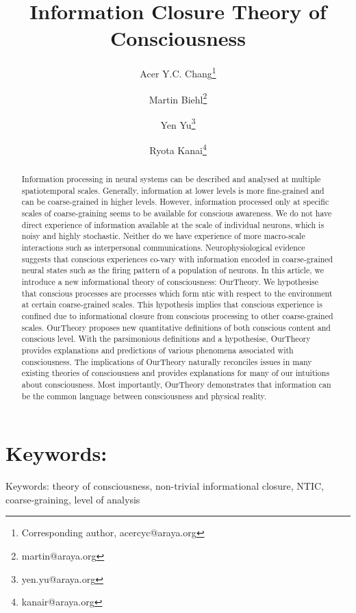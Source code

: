 \documentclass[utf8]{article}
\title{Information Closure Theory of Consciousness}
\date{}
\author[]{Acer Y.C. Chang\thanks{Corresponding author, acercyc@araya.org}}
\author[]{Martin Biehl\thanks{martin@araya.org}}
\author[]{Yen Yu\thanks{yen.yu@araya.org}}
\author[]{Ryota Kanai\thanks{kanair@araya.org }}
\affil[]{ARAYA, Inc., Tokyo, Japan}
\begin{document}
    \linenumbers
	\maketitle
	\tableofcontents


	\begin{abstract}
		Information processing in neural systems can be described and analysed at multiple spatiotemporal scales. Generally, information at lower levels is more fine-grained and can be coarse-grained in higher levels. However, information processed only at specific scales of coarse-graining seems to be available for conscious awareness. We do not have direct experience of information available at the scale of individual neurons, which is noisy and highly stochastic. Neither do we have experience of more macro-scale interactions such as interpersonal communications. Neurophysiological evidence suggests that conscious experiences co-vary with information encoded in coarse-grained neural states such as the firing pattern of a population of neurons. In this article, we introduce a new informational theory of consciousness: \acf{OurTheory}. We hypothesise that conscious processes are processes which form \ac{ntic} with respect to the environment at certain coarse-grained scales. This hypothesis implies that conscious experience is confined due to informational closure from conscious processing to other coarse-grained scales. \ac{OurTheory} proposes new quantitative definitions of both conscious content and conscious level. With the parsimonious definitions and a hypothesise, \ac{OurTheory} provides explanations and predictions of various phenomena associated with consciousness. The implications of \ac{OurTheory} naturally reconciles issues in many existing theories of consciousness and provides explanations for many of our intuitions about consciousness. Most importantly, \ac{OurTheory} demonstrates that information can be the common language between consciousness and physical reality.

		
	\end{abstract}


	\section*{Keywords:}
	Keywords: theory of consciousness, non-trivial informational closure, NTIC, coarse-graining, level of analysis

\end{document}
